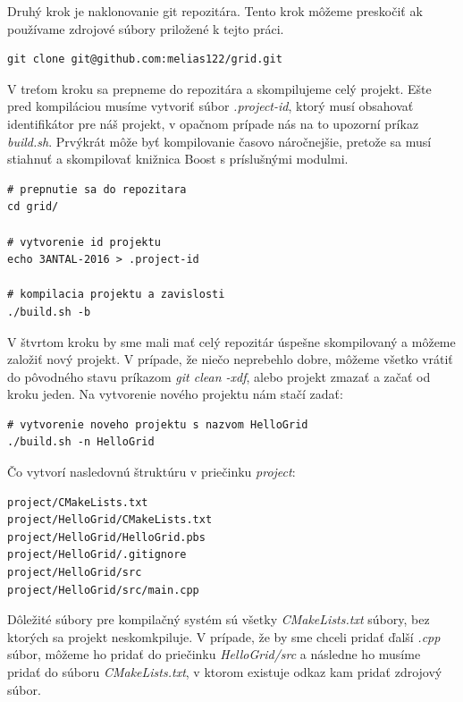 Druhý krok je naklonovanie git repozitára. Tento krok môžeme preskočiť ak používame zdrojové súbory priložené k tejto práci.
\begin{lstlisting}
git clone git@github.com:melias122/grid.git
\end{lstlisting}

V treťom kroku sa prepneme do repozitára a skompilujeme celý projekt.
Ešte pred kompiláciou musíme vytvoriť súbor \textit{.project-id}, ktorý musí obsahovať
identifikátor pre náš projekt, v opačnom prípade nás na to upozorní príkaz \textit{build.sh}.
Prvýkrát môže byť kompilovanie časovo náročnejšie, pretože sa musí stiahnuť a skompilovať knižnica Boost s príslušnými modulmi. 
\begin{lstlisting}
# prepnutie sa do repozitara
cd grid/

# vytvorenie id projektu
echo 3ANTAL-2016 > .project-id

# kompilacia projektu a zavislosti
./build.sh -b
\end{lstlisting}

V štvrtom kroku by sme mali mať celý repozitár úspešne skompilovaný a môžeme založiť nový projekt.
V prípade, že niečo neprebehlo dobre, môžeme všetko vrátiť do pôvodného stavu príkazom \textit{git clean -xdf}, alebo projekt zmazať a začať od kroku jeden.
Na vytvorenie nového projektu nám stačí zadať:
\begin{lstlisting}
# vytvorenie noveho projektu s nazvom HelloGrid
./build.sh -n HelloGrid
\end{lstlisting}
Čo vytvorí nasledovnú štruktúru v priečinku \textit{project}:
\begin{lstlisting}
project/CMakeLists.txt
project/HelloGrid/CMakeLists.txt
project/HelloGrid/HelloGrid.pbs
project/HelloGrid/.gitignore
project/HelloGrid/src
project/HelloGrid/src/main.cpp
\end{lstlisting}
Dôležité súbory pre kompilačný systém sú všetky \textit{CMakeLists.txt} súbory, bez ktorých sa projekt neskomkpiluje.
V prípade, že by sme chceli pridať ďalší \textit{.cpp} súbor, môžeme ho pridať do priečinku \textit{HelloGrid/src} a následne ho musíme pridať do
súboru \textit{CMakeLists.txt}, v ktorom existuje odkaz kam pridať zdrojový súbor.

